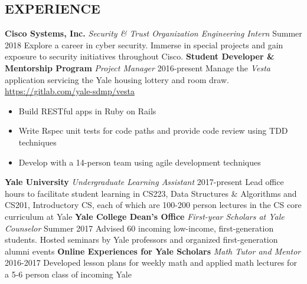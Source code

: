 \documentclass[margin, centered]{res}
\begin{document}
\begin{resume}
  \section{EXPERIENCE}
  \textbf{Cisco Systems, Inc.} \textit{Security \& Trust Organization Engineering Intern} \hfill 
  Summer 2018 \newline
  Explore a career in cyber security. Immerse in special projects and gain exposure to security
  initiatives throughout Cisco.\smallskip \newline 
  \textbf{Student Developer \&  Mentorship Program} \textit{Project Manager} \hfill 2016-present \newline
  Manage the \textit{Vesta} application servicing the Yale housing lottery and room draw. \newline 
  \href{https://gitlab.com/yale-sdmp/vesta}{https://gitlab.com/yale-sdmp/vesta}\smallskip{}
  \begin{itemize}
    \item Build RESTful apps in Ruby on Rails
    \item Write Rspec unit tests for code paths and provide code review using TDD techniques
    \item Develop with a 14-person team using agile development techniques
  \end{itemize}
  \textbf{Yale University} \textit{Undergraduate Learning Assistant} \hfill 2017-present \newline
  Lead office hours to facilitate student learning in CS223, Data Structures
  \& Algorithms and CS201, Introductory CS, each of which are 100-200 person lectures in the CS core curriculum at Yale \newline 
  \textbf{Yale College Dean's Office} \textit{First-year Scholars at Yale Counselor} \hfill Summer 2017 \newline
  Advised 60 incoming low-income, first-generation students. Hosted seminars by Yale professors and organized first-generation alumni events \newline
  \textbf{Online Experiences for Yale Scholars} \textit{Math Tutor and Mentor} \hfill 2016-2017 \newline
  Developed lesson plans for weekly math and applied math lectures for a 5-6 person class of incoming Yale 


\end{resume}
\end{document}
